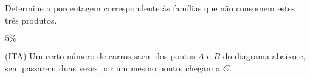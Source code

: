 \begin{secExercicios}
\begin{exer}
    Determine a porcentagem correspondente às famílias que não consomem estes três produtos.
\end{exer}
\begin{resp}
    $5\%$
\end{resp}

\begin{exer}
(ITA) Um certo número de carros saem dos pontos $A$ e $B$ do diagrama abaixo e, sem passarem duas vezes por um mesmo ponto, chegam a $C$. 

\begin{center}
\begin{tikzpicture}[x=0.75pt,y=0.75pt,yscale=-1,xscale=1]


\end{tikzpicture}
\end{center}
\end{exer}
\end{secExercicios}
